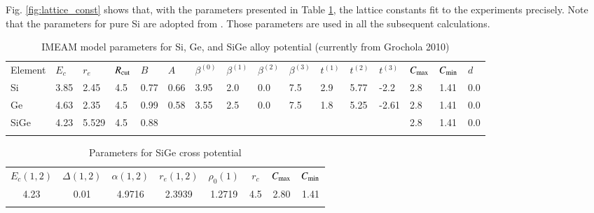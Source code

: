 \documentclass[review]{elsarticle}
\begin{document}
{Fig. \ref{fig:lattice_const} shows that, with the parameters presented in Table \ref{tab:param}, the lattice constants fit to the experiments \cite{dismukes1964thermal} precisely. Note that the parameters for pure Si are adopted from \cite{ryu2009improved}. Those parameters are used in all the subsequent calculations.

\begin{table}[H]
\caption{IMEAM model parameters for Si, Ge, and SiGe alloy potential (currently from Grochola 2010)}
\label{tab:param}       %
\begin{tabular}{l  l   l   l   l   l   l   l   l   l   l   l   l    l   l   l }
\hline\noalign{\smallskip}
 Element  & $E_c$ & $r_e$ & $R_{\rm cut}$ & $B$ & $A$ & $\beta^(0)$ & $\beta^{(1)}$ & 
           $\beta^{(2)}$ & $\beta^{(3)}$ & $t^{(1)}$ & $t^{(2)}$ & $t^{(3)}$ & $C_{\rm max}$ & 
           $C_{\rm min}$ & $d$ \\
\noalign{\smallskip}\hline\noalign{\smallskip}\small
 Si       & 3.85 & 2.45 & 4.5 & 0.77 & 0.66 & 3.95 & 2.0 & 
          0.0 & 7.5 & 2.9 & 5.77 & -2.2 & 2.8 & 
           1.41 & 0.0 \\
 Ge     & 4.63 & 2.35 & 4.5 & 0.99 & 0.58 & 3.55 & 2.5 & 
           0.0 & 7.5 & 1.8 & 5.25 & -2.61 & 2.8 & 
          1.41 & 0.0 \\
 SiGe   & 4.23 & 5.529 & 4.5  & 0.88 &  &   &  & 
             &   &   &   &   & 2.8 & 
           1.41 & 0.0\\
\noalign{\smallskip}\hline
\end{tabular}
\end{table}


\begin{table}[H]
\centering
\caption{Parameters for SiGe cross potential}
\label{tab:param_cross}       %
\begin{tabular}{c c c c c c c c}
\hline\noalign{\smallskip}
$E_c(1,2)$ & $\Delta(1,2)$ & $\alpha(1,2)$ & $r_e(1,2)$ & $\rho_0(1)$ & $r_c$ & $C_{\rm max}$ &  $C_{\rm min}$ \\
\noalign{\smallskip}\hline\noalign{\smallskip}\small
 4.23 & 0.01 & 4.9716 & 2.3939 & 1.2719 & 4.5 & 2.80 & 1.41 \\
 \noalign{\smallskip}\hline
\end{tabular}
\end{table}
 }
\end{document}
